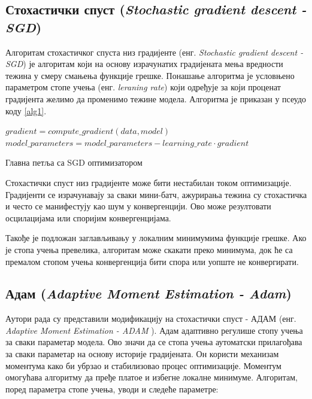 \documentclass[a4paper, 12pt, master, utf8]{etf}
\begin{document}
\subsection{Стохастички спуст (\textit{Stochastic gradient descent - SGD})}

Алгоритам стохастичког спуста низ градијенте (енг. \textit{Stochastic gradient descent - SGD}) је алгоритам који на основу израчунатих градијената мења вредности тежина у смеру смањења функције грешке.
Понашање алгоритма је условњено параметром стопе учења (енг. \textit{leraning rate}) који одређује за који проценат градијента желимо да променимо тежине модела.
Алгоритма је приказан у псеудо коду \ref{alg1}.
\newline

\begin{algorithm}
    \label{alg1}
    \DontPrintSemicolon
     {
         {
            $gradient = compute\_gradient(data, model)$ \;
            $model\_parameters = model\_parameters - learning\_rate \cdot gradient$ \;
        }
    }
    \caption{Главна петља са SGD оптимизатором}
\end{algorithm}

Стохастички спуст низ градијенте може бити нестабилан током оптимизације. Градијенти се израчунавају за сваки мини-батч, ажурирања тежина су стохастичка и често се манифестују као шум у конвергенцији. Ово може резултовати осцилацијама или споријим конвергенцијама.

Такође је подложан заглављивању у локалним минимумима функције грешке. Ако је стопа учења превелика, алгоритам може скакати преко минимума, док ће са премалом стопом учења конвергенција бити спора или уопште не конвергирати.
\newline

\subsection{Адам (\textit{\textit{Adaptive Moment Estimation - Adam}})}

Аутори рада \cite{kingma_adam_2017} су представили модификацију на стохастички спуст - АДАМ (енг. \textit{Adaptive Moment Estimation - ADAM }).
Адам адаптивно регулише стопу учења за сваки параметар модела. Ово значи да се стопа учења аутоматски прилагођава за сваки параметар на основу историје градијената.
Он користи механизам моментума како би убрзао и стабилизовао процес оптимизације. Моментум омогућава алгоритму да пређе платое и избегне локалне минимуме.
Алгоритам, поред параметра стопе учења, уводи и следеће параметре:
\end{document}
